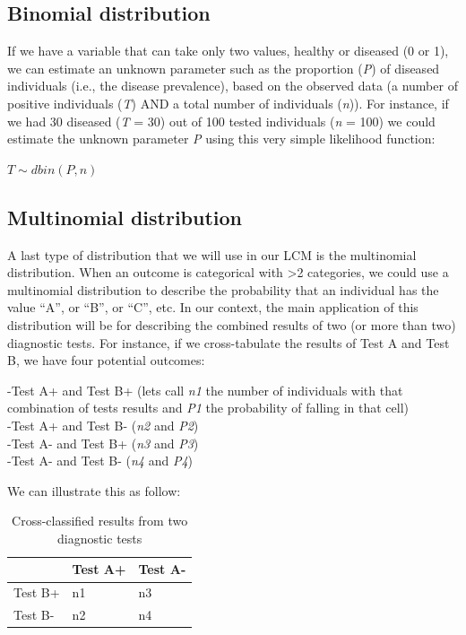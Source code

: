 \documentclass[
]{book}
\begin{document}
\subsection{Binomial distribution}\label{binomial-distribution}

If we have a variable that can take only two values, healthy or diseased (0 or 1), we can estimate an unknown parameter such as the proportion (\emph{P}) of diseased individuals (i.e., the disease prevalence), based on the observed data (a number of positive individuals (\emph{T}) AND a total number of individuals (\emph{n})). For instance, if we had 30 diseased (\emph{T} = 30) out of 100 tested individuals (\emph{n} = 100) we could estimate the unknown parameter \emph{P} using this very simple likelihood function:

\(T \sim dbin(P, n)\)

\subsection{Multinomial distribution}\label{multinomial-distribution}

A last type of distribution that we will use in our LCM is the multinomial distribution. When an outcome is categorical with \textgreater2 categories, we could use a multinomial distribution to describe the probability that an individual has the value ``A'', or ``B'', or ``C'', etc. In our context, the main application of this distribution will be for describing the combined results of two (or more than two) diagnostic tests. For instance, if we cross-tabulate the results of Test A and Test B, we have four potential outcomes:

-Test A+ and Test B+ (lets call \emph{n1} the number of individuals with that combination of tests results and \emph{P1} the probability of falling in that cell)\\
-Test A+ and Test B- (\emph{n2} and \emph{P2})\\
-Test A- and Test B+ (\emph{n3} and \emph{P3})\\
-Test A- and Test B- (\emph{n4} and \emph{P4})

We can illustrate this as follow:

\begin{table}
\centering
\caption{Cross-classified results from two diagnostic tests}
\centering
\begin{tabular}[t]{l|l|l}
\hline
  & Test A+ & Test A-\\
\hline
Test B+ & n1 & n3\\
\hline
Test B- & n2 & n4\\
\hline
\end{tabular}
\end{table}
\end{document}
